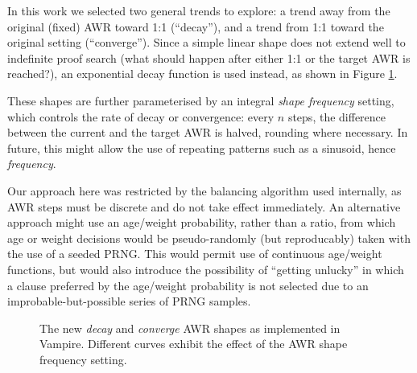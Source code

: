 \documentclass{llncs}
\begin{document}
In this work we selected two general trends to explore: a trend away from the original (fixed) AWR toward 1:1 (``decay''), and a trend from 1:1 toward the original setting (``converge'').
Since a simple linear shape does not extend well to indefinite proof search (what should happen after either 1:1 or the target AWR is reached?), an exponential decay function is used instead, as shown in Figure \ref{fig:decay-and-converge}.

These shapes are further parameterised by an integral \emph{shape frequency} setting, which controls the rate of decay or convergence: every \(n\) steps, the difference between the current and the target AWR is halved, rounding where necessary.
In future, this might allow the use of repeating patterns such as a sinusoid, hence \emph{frequency}.

Our approach here was restricted by the balancing algorithm used internally, as AWR steps must be discrete and do not take effect immediately.
An alternative approach might use an age/weight probability, rather than a ratio, from which age or weight decisions would be pseudo-randomly (but reproducably) taken with the use of a seeded PRNG.
This would permit use of continuous age/weight functions, but would also introduce the possibility of ``getting unlucky'' in which a clause preferred by the age/weight probability is not selected due to an improbable-but-possible series of PRNG samples.

\begin{figure}
	\caption{The new \emph{decay} and \emph{converge} AWR shapes as implemented in Vampire. Different curves exhibit the effect of the AWR shape frequency setting.}
	\label{fig:decay-and-converge}
\end{figure}
\end{document}
